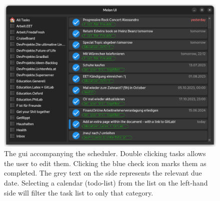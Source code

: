 \documentclass{prettytex/ox/mmsc-special-topic}
\title{\topictitle}
\author{Candidate \candidatenumber}
\date{\today}
\begin{document}
  \pagestyle{plain}
  \mmscSpecialHeader

  \begin{abstract}
    \label{abstract}
    In this project report we will implement a task scheduling method on the basis of a \gls{mcmc} method with Simulated Annealing. The project is available as a software package \textbf{melon-scheduler} on PyPi.


    The algorithm is implemented four times, twice in Python, once in Rust and also in C++.
    Python module bindings to these low-level language implementations are provided using \texttt{rust-cpython} and \texttt{pybind11}, respectively.
  \end{abstract}

  \begin{figure}[H]
    \centering
    \includegraphics[width=0.85\linewidth]{figures/melon-ui.png}
    \caption{The \gls{gui} accompanying the scheduler. Double clicking tasks allows the user to edit them. Clicking the blue check icon marks them as completed. The grey text on the side represents the relevant due date. Selecting a calendar (todo-list) from the list on the left-hand side will filter the task list to only that category.}
    \label{fig:gui}
  \end{figure}

  \pagebreak
  \pagestyle{normal}


  
  
  
  
  
  
\end{document}
